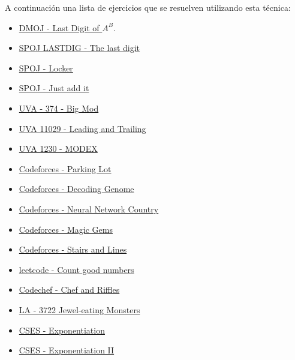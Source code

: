 A continuación una lista de ejercicios que se resuelven utilizando esta técnica:

\begin{itemize}
	\item \href{https://dmoj.uclv.edu.cu/problem/digitlast} {DMOJ - Last Digit of $A^B$}.
	\item \href{https://www.spoj.com/problems/LASTDIG/}{SPOJ LASTDIG - The last digit}
	\item \href{http://www.spoj.com/problems/LOCKER/}{SPOJ - Locker}
	\item \href{http://www.spoj.com/problems/ZSUM/}{SPOJ - Just add it}
	\item \href{https://onlinejudge.org/index.php?option=com_onlinejudge&Itemid=8&category=24&page=show_problem&problem=310}{UVA - 374 - Big Mod}
	\item \href{https://onlinejudge.org/index.php?option=onlinejudge&page=show_problem&problem=1970}{UVA 11029 - Leading and Trailing}
	\item \href{http://uva.onlinejudge.org/index.php?option=com_onlinejudge&Itemid=8&category=24&page=show_problem&problem=3671}{UVA 1230 - MODEX}
	\item \href{http://codeforces.com/problemset/problem/630/I}{Codeforces - Parking Lot}
	\item \href{https://codeforces.com/contest/222/problem/E}{Codeforces - Decoding Genome}
	\item \href{https://codeforces.com/contest/852/problem/B}{Codeforces - Neural Network Country}
	\item \href{https://codeforces.com/problemset/problem/1117/D}{Codeforces - Magic Gems}
	\item \href{https://codeforces.com/contest/498/problem/E}{Codeforces - Stairs and Lines}
	\item \href{https://leetcode.com/problems/count-good-numbers/}{leetcode - Count good numbers}
	\item \href{https://www.codechef.com/JAN221B/problems/RIFFLES}{Codechef - Chef and Riffles}
	\item \href{https://vjudge.net/problem/UVALive-3722}{LA - 3722 Jewel-eating Monsters}
	\item \href{https://cses.fi/problemset/task/1095}{CSES - Exponentiation}
	\item \href{https://cses.fi/problemset/task/1712}{CSES - Exponentiation II}
\end{itemize}